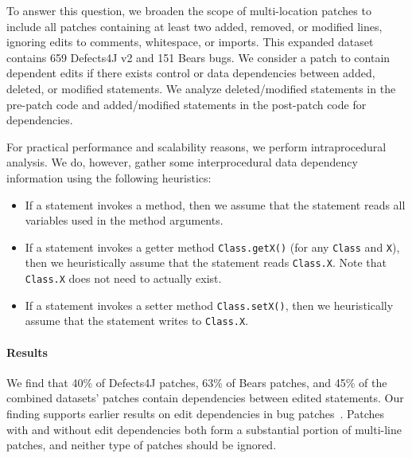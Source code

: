 \documentclass[sigconf, timestamp-false, anonymous=true]{acmart}
\begin{document}
To answer this question, we broaden the scope of multi-location patches to 
include all patches containing at least two added, removed, or modified lines, 
ignoring edits to comments, whitespace, or imports.
This expanded dataset contains 659 Defects4J v2 and 151 Bears bugs.
We consider a patch to contain dependent edits if there exists 
control or data dependencies between added, deleted, or modified statements.
We analyze deleted/modified statements in the pre-patch code 
and added/modified statements in the post-patch code for dependencies.
  
For practical performance and scalability reasons, 
we perform intraprocedural analysis. 
We do, however, gather some interprocedural data dependency information 
using the following heuristics:
\begin{itemize}
	\item If a statement invokes a method, then we assume that
	the statement reads all variables used in the method arguments.
	\item If a statement invokes a getter method \texttt{Class.getX()} 
	(for any \texttt{Class} and \texttt{X}), then we heuristically 
	assume that the statement reads \texttt{Class.X}. 
	Note that \texttt{Class.X} does not need to actually exist.
	\item If a statement invokes a setter method \texttt{Class.setX()}, 
	then we heuristically assume that the statement writes to \texttt{Class.X}. 
\end{itemize}

\paragraph{Results}

We find that 40\% of Defects4J patches, 63\% of Bears patches, 
and 45\% of the combined datasets' patches contain dependencies 
between edited statements.
Our finding supports earlier results on edit dependencies in 
bug patches~\cite{zhong2015}.
Patches with and without edit dependencies both form a substantial
portion of multi-line patches,
and neither type of patches should be ignored.
\end{document}
